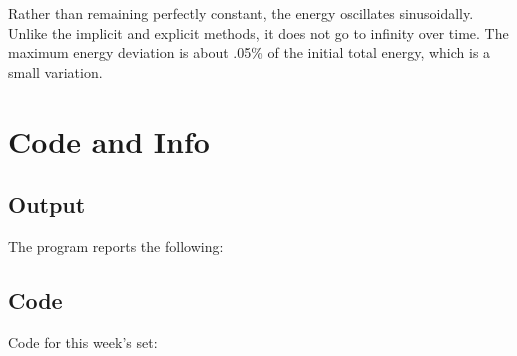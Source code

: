 \documentclass{article}
\begin{document}
Rather than remaining perfectly constant, the energy oscillates sinusoidally. Unlike the implicit and explicit methods, it does not go
to infinity over time. The maximum energy deviation is about .05\% of the initial total energy, which is a small variation.

\section{Code and Info}
\subsection{Output}
The program reports the following:


\subsection{Code}
Code for this week's set:

\end{document}
